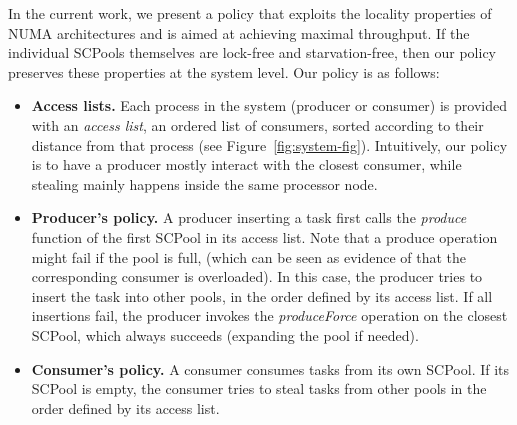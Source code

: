 In the current work, we present a policy that exploits the locality properties of NUMA architectures and is aimed at achieving maximal throughput. If the individual SCPools themselves are lock-free and starvation-free, then our policy preserves these properties at the system level. Our policy is as follows:
\begin{itemize}
	\item {\bf Access lists.} Each process in the system (producer or consumer) is provided with an \emph{access list}, an ordered list of consumers, sorted according to their distance from that process (see Figure~\ref{fig:system-fig}). Intuitively, our policy is to have a producer mostly interact with the closest consumer, while stealing mainly happens inside the same processor node. 
	\item {\bf Producer's policy.} A producer inserting a task first calls the \emph{produce} function of the first SCPool in its access list. Note that a produce operation might fail if the pool is full, (which can be seen as evidence of that the corresponding consumer is overloaded).  In this case, the producer tries to insert the task into other pools, in the order defined by its access list. If all insertions fail, the producer invokes the \emph{produceForce} operation on the closest SCPool, which always succeeds (expanding the pool if needed). 
	\item {\bf Consumer's policy.} A consumer consumes tasks from its own SCPool. If its SCPool is empty, the consumer tries to steal tasks from other pools in the order defined by its access list. 
\end{itemize}





